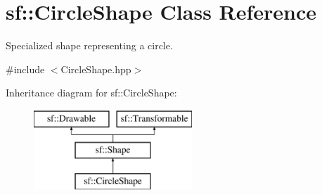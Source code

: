 \hypertarget{classsf_1_1CircleShape}{\section{sf\-:\-:Circle\-Shape Class Reference}
\label{classsf_1_1CircleShape}
}


Specialized shape representing a circle.  




{\ttfamily \#include $<$Circle\-Shape.\-hpp$>$}

Inheritance diagram for sf\-:\-:Circle\-Shape\-:\begin{figure}[H]
\begin{center}
\leavevmode
\includegraphics[height=3.000000cm]{classsf_1_1CircleShape}
\end{center}
\end{figure}
